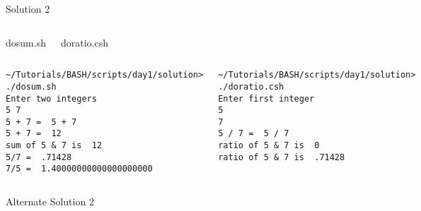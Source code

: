 \documentclass[10pt,t]{beamer}
\begin{document}
\begin{frame}[fragile]{Solution 2}
  \begin{columns}
    \vspace{-0.5cm}
    \begin{exampleblock}{dosum.sh}
      
    \end{exampleblock}
    \vspace{-0.5cm}
    \begin{block}{doratio.csh}
      
    \end{block}
  \end{columns}
  \begin{columns}
    \begin{exampleblock}{}
      \begin{lstlisting}[basicstyle=\tiny\ttfamily]
~/Tutorials/BASH/scripts/day1/solution> ./dosum.sh 
Enter two integers
5 7
5 + 7 =  5 + 7
5 + 7 =  12
sum of 5 & 7 is  12
5/7 =  .71428
7/5 =  1.40000000000000000000
      \end{lstlisting}
    \end{exampleblock}
    \begin{block}{}
      \begin{lstlisting}[basicstyle=\tiny\ttfamily]
~/Tutorials/BASH/scripts/day1/solution> ./doratio.csh 
Enter first integer
5
7
5 / 7 =  5 / 7
ratio of 5 & 7 is  0
ratio of 5 & 7 is  .71428
      \end{lstlisting}
    \end{block}
  \end{columns}
\end{frame}

\begin{frame}[fragile]{Alternate Solution 2}
  \fontsize{7}{9}\selectfont{
    \begin{columns}
      \column{0.5\textwidth}
      \vspace{-0.75cm}
      \begin{exampleblock}{}%
        
      \end{exampleblock}
      \column{0.4\textwidth}
      \vspace{-0.75cm}
      \begin{block}{}%
        
      \end{block}
    \end{columns}
  }
\end{frame}
\end{document}
